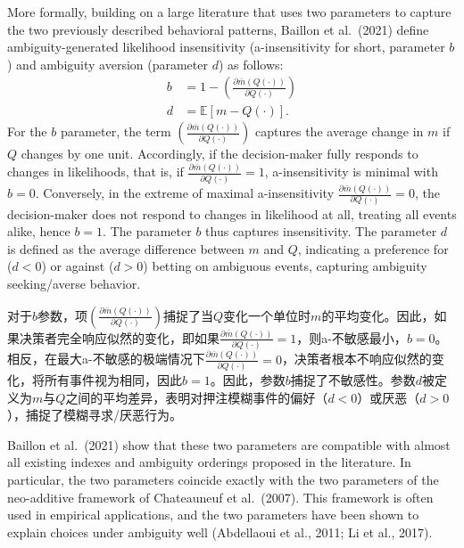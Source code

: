 \documentclass[12pt,a4paper]{article}
\newenvironment{original}
  {\par\medskip\noindent\color{black}\ignorespaces}
  {\par\medskip}
\newenvironment{translation}
  {\par\noindent\color{transblue}\ignorespaces}
  {\par\medskip\medskip}
\begin{document}
\begin{original}
More formally, building on a large literature that uses two parameters to capture the two previously described behavioral patterns, Baillon et al.\ (2021) define ambiguity-generated likelihood insensitivity (a-insensitivity for short, parameter $b$) and ambiguity aversion (parameter $d$) as follows:
\begin{align}
b &= 1 - \left(\frac{\partial \bar{m}(Q(\cdot))}{\partial Q(\cdot)}\right) \label{eq:1}\\[4pt]
d &= \mathbb{E}[m - Q(\cdot)]. \label{eq:2}
\end{align}
For the $b$ parameter, the term $\left(\frac{\partial \bar{m}(Q(\cdot))}{\partial Q(\cdot)}\right)$ captures the average change in $m$ if $Q$ changes by one unit. Accordingly, if the decision-maker fully responds to changes in likelihoods, that is, if $\frac{\partial \bar{m}(Q(\cdot))}{\partial Q(\cdot)} = 1$, a-insensitivity is minimal with $b = 0$. Conversely, in the extreme of maximal a-insensitivity $\frac{\partial \bar{m}(Q(\cdot))}{\partial Q(\cdot)} = 0$, the decision-maker does not respond to changes in likelihood at all, treating all events alike, hence $b = 1$. The parameter $b$ thus captures insensitivity. The parameter $d$ is defined as the average difference between $m$ and $Q$, indicating a preference for ($d < 0$) or against ($d > 0$) betting on ambiguous events, capturing ambiguity seeking/averse behavior.
\end{original}

\begin{translation}
对于$b$参数，项$\left(\frac{\partial \bar{m}(Q(\cdot))}{\partial Q(\cdot)}\right)$捕捉了当$Q$变化一个单位时$m$的平均变化。因此，如果决策者完全响应似然的变化，即如果$\frac{\partial \bar{m}(Q(\cdot))}{\partial Q(\cdot)} = 1$，则a-不敏感最小，$b = 0$。相反，在最大a-不敏感的极端情况下$\frac{\partial \bar{m}(Q(\cdot))}{\partial Q(\cdot)} = 0$，决策者根本不响应似然的变化，将所有事件视为相同，因此$b = 1$。因此，参数$b$捕捉了不敏感性。参数$d$被定义为$m$与$Q$之间的平均差异，表明对押注模糊事件的偏好（$d < 0$）或厌恶（$d > 0$），捕捉了模糊寻求/厌恶行为。
\end{translation}

\begin{original}
Baillon et al.\ (2021) show that these two parameters are compatible with almost all existing indexes and ambiguity orderings proposed in the literature. In particular, the two parameters coincide exactly with the two parameters of the neo-additive framework of Chateauneuf et al.\ (2007). This framework is often used in empirical applications, and the two parameters have been shown to explain choices under ambiguity well (Abdellaoui et al., 2011; Li et al., 2017).
\end{original}
\end{document}
